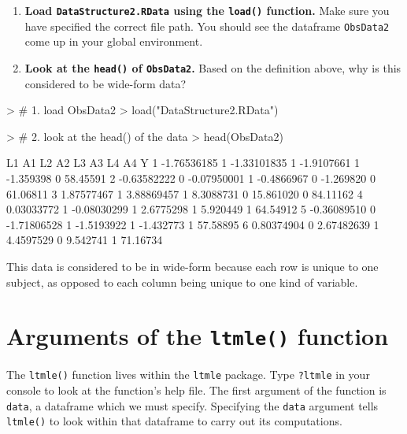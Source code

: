\documentclass[answers]{exam}
\begin{document}
\begin{enumerate}
\item \textbf{Load \texttt{DataStructure2.RData} using the \texttt{load()} function.} Make sure you have specified the correct file path. You should see the dataframe \texttt{ObsData2} come up in your global environment.
\item \textbf{Look at the \texttt{head()} of \texttt{ObsData2}.} Based on the definition above, why is this considered to be wide-form data?
\end{enumerate}
\begin{solution}
\begin{Schunk}
\begin{Sinput}
> # 1. load ObsData2
> load("DataStructure2.RData")
\end{Sinput}
\end{Schunk}
\begin{Schunk}
\begin{Sinput}
> # 2. look at the head() of the data
> head(ObsData2)
\end{Sinput}
\begin{Soutput}
           L1 A1          L2 A2         L3 A3        L4 A4        Y
1 -1.76536185  1 -1.33101835  1 -1.9107661  1 -1.359398  0 58.45591
2 -0.63582222  0 -0.07950001  1 -0.4866967  0 -1.269820  0 61.06811
3  1.87577467  1  3.88869457  1  8.3088731  0 15.861020  0 84.11162
4  0.03033772  1 -0.08030299  1  2.6775298  1  5.920449  1 64.54912
5 -0.36089510  0 -1.71806528  1 -1.5193922  1 -1.432773  1 57.58895
6  0.80374904  0  2.67482639  1  4.4597529  0  9.542741  1 71.16734
\end{Soutput}
\end{Schunk}

This data is considered to be in wide-form because each row is unique to one subject, as opposed to each column being unique to one kind of variable.
\end{solution}

\section{Arguments of the \texttt{ltmle()} function}

The \texttt{ltmle()} function lives within the \texttt{ltmle} package. Type \texttt{?ltmle} in your console to look at the function's help file. 
The first argument of the function is \texttt{data}, a dataframe which we must specify. Specifying the \texttt{data} argument tells \texttt{ltmle()} to look within that dataframe to carry out its computations. 
\end{document}
